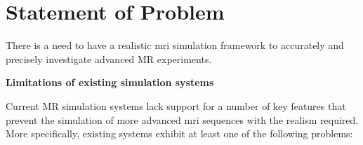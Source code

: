 \section{Statement of Problem}\label{chapterlabel1sec1}
There is a need to have a realistic \ac{mri} simulation framework to accurately and precisely investigate advanced MR experiments.

\hfill


\large \textbf{Limitations of existing simulation systems} \normalsize

Current MR simulation systems lack support for a number of key features that prevent the simulation of more advanced \ac{mri} sequences with the realism required. 
More specifically, existing systems exhibit at least one of the following problems:

